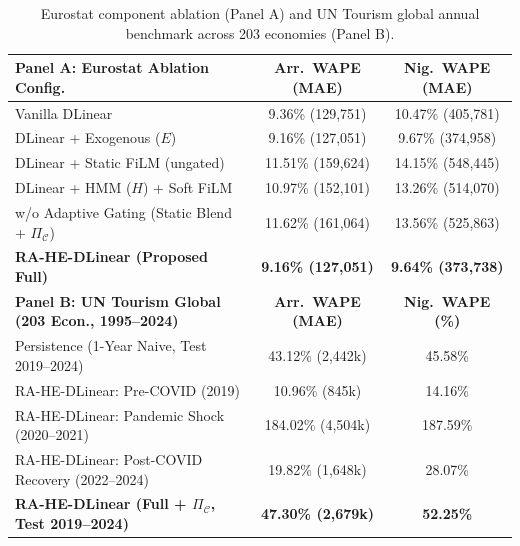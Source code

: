 \documentclass[sigconf]{acmart}
\begin{document}
\begin{table}[!t]
\centering
\caption{Eurostat component ablation (Panel A) and UN Tourism global annual benchmark across 203 economies (Panel B).}
\label{tab:compact_ablation}
\scriptsize
\setlength{\tabcolsep}{2.5pt}
\renewcommand{\arraystretch}{0.90}
\begin{tabular}{@{}lcc@{}}
\toprule
\textbf{Panel A: Eurostat Ablation Config.} & \textbf{Arr.\ WAPE (MAE)} & \textbf{Nig.\ WAPE (MAE)} \\
\midrule
Vanilla DLinear & 9.36\% (129,751) & 10.47\% (405,781) \\
DLinear + Exogenous ($E$) & 9.16\% (127,051) & 9.67\% (374,958) \\
DLinear + Static FiLM (ungated) & 11.51\% (159,624) & 14.15\% (548,445) \\
DLinear + HMM ($H$) + Soft FiLM & 10.97\% (152,101) & 13.26\% (514,070) \\
w/o Adaptive Gating (Static Blend + $\Pi_{\mathcal{C}}$) & 11.62\% (161,064) & 13.56\% (525,863) \\
\textbf{RA-HE-DLinear (Proposed Full)} & \textbf{9.16\% (127,051)} & \textbf{9.64\% (373,738)} \\
\midrule
\textbf{Panel B: UN Tourism Global (203 Econ., 1995--2024)} & \textbf{Arr.\ WAPE (MAE)} & \textbf{Nig.\ WAPE (\%)} \\
\midrule
Persistence (1-Year Naive, Test 2019--2024) & 43.12\% (2,442k) & 45.58\% \\
RA-HE-DLinear: Pre-COVID (2019) & 10.96\% (845k) & 14.16\% \\
RA-HE-DLinear: Pandemic Shock (2020--2021) & 184.02\% (4,504k) & 187.59\% \\
RA-HE-DLinear: Post-COVID Recovery (2022--2024) & 19.82\% (1,648k) & 28.07\% \\
\textbf{RA-HE-DLinear (Full + $\Pi_{\mathcal{C}}$, Test 2019--2024)} & \textbf{47.30\% (2,679k)} & \textbf{52.25\%} \\
\bottomrule
\end{tabular}
\end{table}
\end{document}

